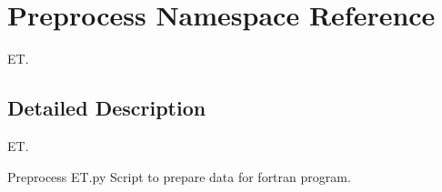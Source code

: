 \hypertarget{namespace_preprocess}{}\section{Preprocess Namespace Reference}
\label{namespace_preprocess}


E\+T.  




\subsection{Detailed Description}
E\+T. 

\begin{DoxyVerb}Preprocess ET.py
Script to prepare data for fortran program.
\end{DoxyVerb}
 